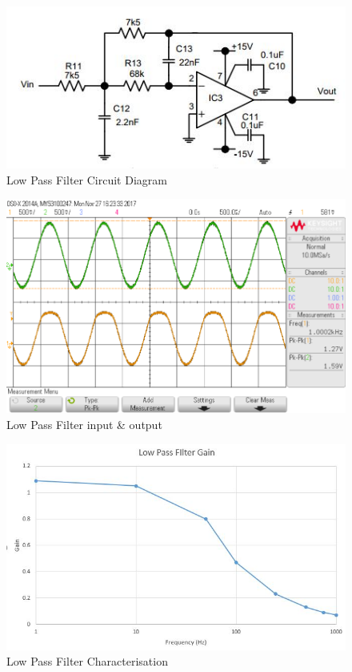 \documentclass[10pt,a4paper]{article}
\begin{document}
\begin{figure}
\includegraphics[width=\textwidth]{LPF}
\caption{Low Pass Filter Circuit Diagram}
\label{LPF}
\end{figure}

\begin{figure}[!h]
\includegraphics[width =\textwidth]{lpfilter}
\caption{Low Pass Filter input \& output}
\label{LPFscope}
\end{figure}

\begin{figure}[!h]
\includegraphics[width = \textwidth]{LPFchar}
\caption{Low Pass Filter Characterisation}
\label{LPFchar}
\end{figure}
\end{document}
